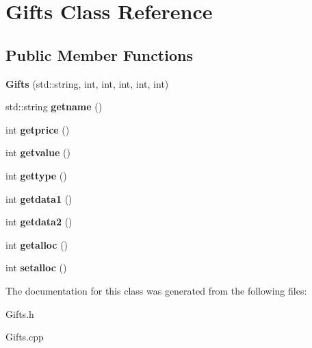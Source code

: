 \hypertarget{classGifts}{}\section{Gifts Class Reference}
\label{classGifts}
\subsection*{Public Member Functions}
\begin{DoxyCompactItemize}
\item 
{\bfseries Gifts} (std\+::string, int, int, int, int, int)\hypertarget{classGifts_ac20af97c7cb3f3fde42e09ee13df4c27}{}\label{classGifts_ac20af97c7cb3f3fde42e09ee13df4c27}

\item 
std\+::string {\bfseries getname} ()\hypertarget{classGifts_ab0c17e6403a787f8abf91646562c0700}{}\label{classGifts_ab0c17e6403a787f8abf91646562c0700}

\item 
int {\bfseries getprice} ()\hypertarget{classGifts_a1a2e0cf82f33a817dbd93b87ae9fc3a8}{}\label{classGifts_a1a2e0cf82f33a817dbd93b87ae9fc3a8}

\item 
int {\bfseries getvalue} ()\hypertarget{classGifts_ac4cc9dbe30cf0eb9365e2f58588328f3}{}\label{classGifts_ac4cc9dbe30cf0eb9365e2f58588328f3}

\item 
int {\bfseries gettype} ()\hypertarget{classGifts_a4472ba07e26a6e69a312cb29fe7bc31e}{}\label{classGifts_a4472ba07e26a6e69a312cb29fe7bc31e}

\item 
int {\bfseries getdata1} ()\hypertarget{classGifts_a0d4ff5536ac24da9060c07ec0084dea0}{}\label{classGifts_a0d4ff5536ac24da9060c07ec0084dea0}

\item 
int {\bfseries getdata2} ()\hypertarget{classGifts_ae20069ce1df4c36bd8792368efbc4778}{}\label{classGifts_ae20069ce1df4c36bd8792368efbc4778}

\item 
int {\bfseries getalloc} ()\hypertarget{classGifts_a58891f3c82800c301dcc5fd1d73a9c17}{}\label{classGifts_a58891f3c82800c301dcc5fd1d73a9c17}

\item 
int {\bfseries setalloc} ()\hypertarget{classGifts_a4810f0100356adde09a20684e4c1d03c}{}\label{classGifts_a4810f0100356adde09a20684e4c1d03c}

\end{DoxyCompactItemize}


The documentation for this class was generated from the following files\+:\begin{DoxyCompactItemize}
\item 
Gifts.\+h\item 
Gifts.\+cpp\end{DoxyCompactItemize}
